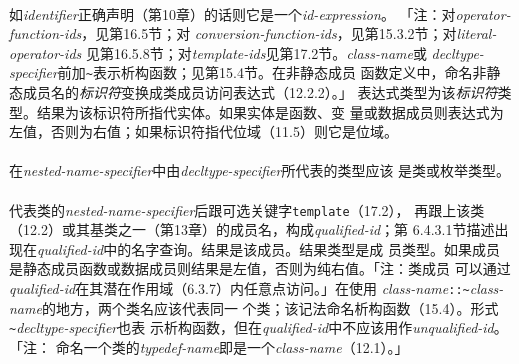 
\paragraph{}
如\textit{identifier}正确声明（第10章）的话则它是一个\textit{id-expression}。
「注：对\textit{operator-function-ids}，见第16.5节；对
\textit{conversion-function-ids}，见第15.3.2节；对\textit{literal-operator-ids}
见第16.5.8节；对\textit{template-ids}见第17.2节。\textit{class-name}或
\textit{decltype-specifier}前加\texttt{\~}表示析构函数；见第15.4节。在非静态成员
函数定义中，命名非静态成员名的\textit{标识符}变换成类成员访问表达式（12.2.2）。」
表达式类型为该\textit{标识符}类型。结果为该标识符所指代实体。如果实体是函数、变
量或数据成员则表达式为左值，否则为右值；如果标识符指代位域（11.5）则它是位域。

  \synprd{\texttt{::}}

\paragraph{}
在\textit{nested-name-specifier}中由\textit{decltype-specifier}所代表的类型应该
是类或枚举类型。

\paragraph{}
代表类的\textit{nested-name-specifier}后跟可选关键字\texttt{template}（17.2），
再跟上该类（12.2）或其基类之一（第13章）的成员名，构成\textit{qualified-id}；第
6.4.3.1节描述出现在\textit{qualified-id}中的名字查询。结果是该成员。结果类型是成
员类型。如果成员是静态成员函数或数据成员则结果是左值，否则为纯右值。「注：类成员
可以通过\textit{qualified-id}在其潜在作用域（6.3.7）内任意点访问。」在使用
\textit{class-name}\texttt{::\~}\textit{class-name}的地方，两个类名应该代表同一
个类；该记法命名析构函数（15.4）。形式\texttt{\~}\textit{decltype-specifier}也表
示析构函数，但在\textit{qualified-id}中不应该用作\textit{unqualified-id}。「注：
命名一个类的\textit{typedef-name}即是一个\textit{class-name}（12.1）。」

